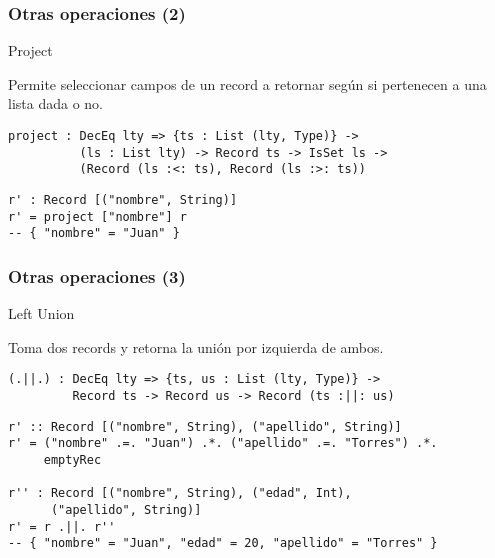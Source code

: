 \documentclass{beamer}
\begin{document}
\begin{frame}[fragile]
\frametitle{Otras operaciones (2)}

\begin{block}{Project}

Permite seleccionar campos de un record a retornar según si pertenecen a una lista dada o no.

\begin{definition}
\begin{verbatim}
project : DecEq lty => {ts : List (lty, Type)} -> 
          (ls : List lty) -> Record ts -> IsSet ls -> 
          (Record (ls :<: ts), Record (ls :>: ts))
\end{verbatim}
\end{definition}

\begin{example}
\begin{verbatim}
r' : Record [("nombre", String)]
r' = project ["nombre"] r
-- { "nombre" = "Juan" }
\end{verbatim}
\end{example}

\end{block}
\end{frame}

\begin{frame}[fragile]
\frametitle{Otras operaciones (3)}

\begin{block}{Left Union}

Toma dos records y retorna la unión por izquierda de ambos.

\begin{definition}
\begin{verbatim}
(.||.) : DecEq lty => {ts, us : List (lty, Type)} -> 
         Record ts -> Record us -> Record (ts :||: us)
\end{verbatim}
\end{definition}

\begin{example}
\begin{verbatim}
r' :: Record [("nombre", String), ("apellido", String)]
r' = ("nombre" .=. "Juan") .*. ("apellido" .=. "Torres") .*. 
     emptyRec

r'' : Record [("nombre", String), ("edad", Int), 
      ("apellido", String)]
r' = r .||. r''
-- { "nombre" = "Juan", "edad" = 20, "apellido" = "Torres" }
\end{verbatim}
\end{example}

\end{block}
\end{frame}
\end{document}
